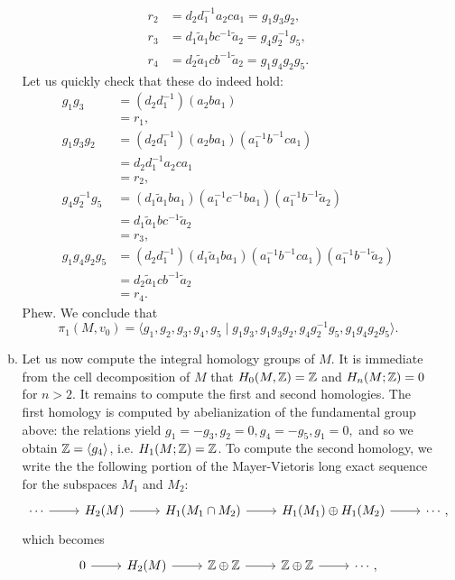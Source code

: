 \documentclass{../mathnotes}
\begin{document}
\begin{enumerate}
\begin{enumerate}[(a)]
\begin{align*}
                    r_2 &=d_2d_1^{-1}a_2ca_1 = g_1g_3g_2,\\
                    r_3 &= d_1\tilde a_1bc^{-1}\tilde a_2 = g_4g_2^{-1}g_5,\\
                    r_4 &= d_2\tilde a_1cb^{-1}\tilde a_2 = g_1g_4g_2g_5.
                \end{align*}
                Let us quickly check that these do indeed hold:
                \begin{align*}
                    g_1g_3 &= (d_2d_1^{-1})(a_2ba_1)\\
                    &= r_1,\\
                    g_1g_3g_2 &= (d_2d_1^{-1})(a_2ba_1)(a_1^{-1}b^{-1}ca_1)\\
                    &=d_2d_1^{-1}a_2ca_1\\
                    &= r_2,\\
                    g_4g_2^{-1}g_5 &= (d_1\tilde a_1ba_1)(a_1^{-1}c^{-1}ba_1)(a_1^{-1}b^{-1}\tilde a_2)\\
                    &=d_1\tilde a_1bc^{-1}\tilde a_2\\
                    &= r_3,\\
                    g_1g_4g_2g_5 &= (d_2d_1^{-1})(d_1\tilde a_1ba_1)(a_1^{-1}b^{-1}ca_1)(a_1^{-1}b^{-1}\tilde a_2)\\
                    &=d_2\tilde a_1cb^{-1}\tilde a_2\\
                    &= r_4.
                \end{align*}
                Phew. We conclude that
                \[\pi_1(M,v_0) = \langle g_1,g_2,g_3,g_4,g_5\mid g_1g_3,g_1g_3g_2,g_4g_2^{-1}g_5,g_1g_4g_2g_5\rangle.\]
            \item Let us now compute the integral homology groups of $M$. It is immediate from the cell decomposition
                of $M$ that $H_0(M,\mathbb{Z})=\mathbb{Z}$ and $H_n(M;\mathbb{Z})=0$ for $n>2$. It remains to compute the first and second
                homologies. The first homology is computed by abelianization of the fundamental group above:
                the relations yield $g_1=-g_3,g_2=0,g_4=-g_5,g_1=0,$ and so we obtain $\mathbb{Z}=\langle g_4\rangle$, i.e.
                $H_1(M;\mathbb{Z})=\mathbb{Z}$. To compute the second homology, we write the the following portion of the Mayer-Vietoris
                long exact sequence for the subspaces $M_1$ and $M_2$:
                \begin{equation*}
                    \begin{tikzcd}
                        \cdots\ar{r}& H_2(M)\ar{r}& H_1(M_1\cap M_2)\ar{r}& H_1(M_1)\oplus H_1(M_2)\ar{r}& \cdots,
                    \end{tikzcd}
                \end{equation*}
                which becomes
                \begin{equation*}
                    \begin{tikzcd}
                        0\ar{r}& H_2(M)\ar{r}& \Z\oplus\Z\ar{r}& \Z\oplus \Z\ar{r}& \cdots,
                    \end{tikzcd}
                \end{equation*}


\end{enumerate}
\end{enumerate}
\end{document}
